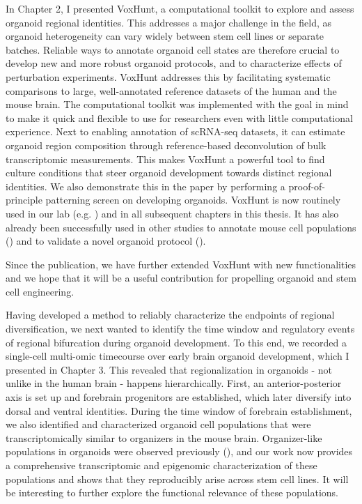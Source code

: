 In Chapter 2, I presented VoxHunt, a computational toolkit to explore and assess organoid regional identities. This addresses a major challenge in the field, as organoid heterogeneity can vary widely between stem cell lines or separate batches. Reliable ways to annotate organoid cell states are therefore crucial to develop new and more robust organoid protocols, and to characterize effects of perturbation experiments. VoxHunt addresses this by facilitating systematic comparisons to large, well-annotated reference datasets of the human and the mouse brain. The computational toolkit was implemented with the goal in mind to make it quick and flexible to use for researchers even with little computational experience. Next to enabling annotation of scRNA-seq datasets, it can estimate organoid region composition through reference-based deconvolution of bulk transcriptomic measurements. This makes VoxHunt a powerful tool to find culture conditions that steer organoid development towards distinct regional identities. We also demonstrate this in the paper by performing a proof-of-principle patterning screen on developing organoids. VoxHunt is now routinely used in our lab (e.g. \cite{kanton_organoid_2019,he_lineage_2022}) and in all subsequent chapters in this thesis. It has also already been successfully used in other studies to annotate mouse cell populations (\cite{la_manno_molecular_2020}) and to validate a novel organoid protocol (\cite{miura_generation_2020}).

Since the publication, we have further extended VoxHunt with new functionalities and we hope that it will be a useful contribution for propelling organoid and stem cell engineering.

Having developed a method to reliably characterize the endpoints of regional diversification, we next wanted to identify the time window and regulatory events of regional bifurcation during organoid development. To this end, we recorded a single-cell multi-omic timecourse over early brain organoid development, which I presented in Chapter 3. This revealed that regionalization in organoids - not unlike in the human brain - happens hierarchically. First, an anterior-posterior axis is set up and forebrain progenitors are established, which later diversify into dorsal and ventral identities. During the time window of forebrain establishment, we also identified and characterized organoid cell populations that were transcriptomically similar to organizers in the mouse brain. Organizer-like populations in organoids were observed previously (\cite{renner_self-organized_2017}), and our work now provides a comprehensive transcriptomic and epigenomic characterization of these populations and shows that they reproducibly arise across stem cell lines. It will be interesting to further explore the functional relevance of these populations. 

